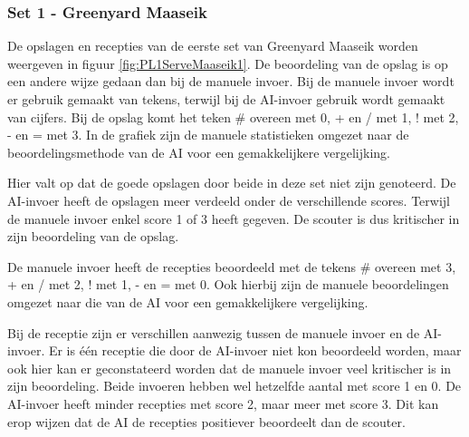 \subsubsection{Set 1 - Greenyard Maaseik}
\label{sec:PL1_Greenyard1}
De opslagen en recepties van de eerste set van Greenyard Maaseik worden weergeven in figuur  \ref{fig:PL1ServeMaaseik1}. De beoordeling van de opslag is op een andere wijze gedaan dan bij de manuele invoer. Bij de manuele invoer wordt er gebruik gemaakt van tekens, terwijl bij de AI-invoer gebruik wordt gemaakt van cijfers. Bij de opslag komt het teken \# overeen met 0, + en / met 1, ! met 2, - en = met 3. In de grafiek zijn de manuele statistieken omgezet naar de beoordelingsmethode van de AI voor een gemakkelijkere vergelijking. 

Hier valt op dat de goede opslagen door beide in deze set niet zijn genoteerd. De AI-invoer heeft de opslagen meer verdeeld onder de verschillende scores. Terwijl de manuele invoer enkel score 1 of 3 heeft gegeven. De scouter is dus kritischer in zijn beoordeling van de opslag.

De manuele invoer heeft de recepties beoordeeld met de tekens \# overeen met 3, + en / met 2, ! met 1, - en = met 0.  Ook hierbij zijn de manuele beoordelingen omgezet naar die van de AI voor een gemakkelijkere vergelijking.

Bij de receptie zijn er verschillen aanwezig tussen de manuele invoer en de AI-invoer. Er is één receptie die door de AI-invoer niet kon beoordeeld worden, maar ook hier kan er geconstateerd worden dat de manuele invoer veel kritischer is in zijn beoordeling. Beide invoeren hebben wel hetzelfde aantal met score 1 en 0. De AI-invoer heeft minder recepties met score 2, maar meer met score 3. Dit kan erop wijzen dat de AI de recepties positiever beoordeelt dan de scouter. 

